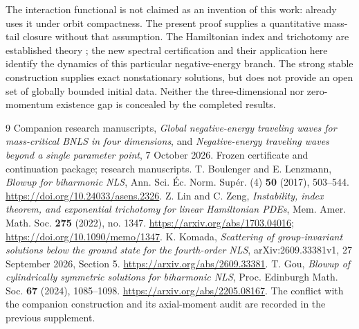 \documentclass[11pt,a4paper]{article}
\theoremstyle{remark}\newtheorem{remark}[theorem]{Remark}
\begin{document}
The interaction functional is not claimed as an invention of this work: \cite{Komada} already uses it under orbit compactness. The present proof supplies a quantitative mass-tail closure without that assumption. The Hamiltonian index and trichotomy are established theory \cite{LZ}; the new spectral certification and their application here identify the dynamics of this particular negative-energy branch. The strong stable construction supplies exact nonstationary solutions, but does not provide an open set of globally bounded initial data. Neither the three-dimensional nor zero-momentum existence gap is concealed by the completed results.

\begin{thebibliography}{9}
 Companion research manuscripts, \emph{Global negative-energy traveling waves for mass-critical BNLS in four dimensions}, and \emph{Negative-energy traveling waves beyond a single parameter point}, 7 October 2026. Frozen certificate and continuation package; research manuscripts.
 T. Boulenger and E. Lenzmann, \emph{Blowup for biharmonic NLS}, Ann. Sci. \'Ec. Norm. Sup\'er. (4) \textbf{50} (2017), 503--544. \url{https://doi.org/10.24033/asens.2326}.
 Z. Lin and C. Zeng, \emph{Instability, index theorem, and exponential trichotomy for linear Hamiltonian PDEs}, Mem. Amer. Math. Soc. \textbf{275} (2022), no. 1347. \url{https://arxiv.org/abs/1703.04016}; \url{https://doi.org/10.1090/memo/1347}.
 K. Komada, \emph{Scattering of group-invariant solutions below the ground state for the fourth-order NLS}, arXiv:2609.33381v1, 27 September 2026, Section 5. \url{https://arxiv.org/abs/2609.33381}.
 T. Gou, \emph{Blowup of cylindrically symmetric solutions for biharmonic NLS}, Proc. Edinburgh Math. Soc. \textbf{67} (2024), 1085--1098. \url{https://arxiv.org/abs/2205.08167}. The conflict with the companion construction and its axial-moment audit are recorded in the previous supplement.
\end{thebibliography}
\end{document}
